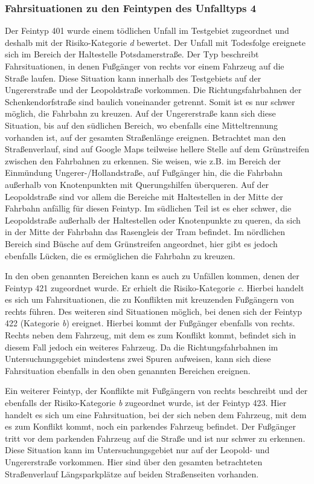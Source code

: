 \subsubsection{Fahrsituationen zu den Feintypen des Unfalltyps 4}
Der Feintyp 401 wurde einem tödlichen Unfall im Testgebiet zugeordnet und deshalb mit der Risiko-Kategorie \textit{d} bewertet. Der Unfall mit Todesfolge ereignete sich im Bereich der Haltestelle Potsdamerstraße. Der Typ beschreibt Fahrsituationen, in denen Fußgänger von rechts vor einem Fahrzeug auf die Straße laufen. Diese Situation kann innerhalb des Testgebiets auf der Ungererstraße und der Leopoldstraße vorkommen. Die Richtungsfahrbahnen der Schenkendorfstraße sind baulich voneinander getrennt. Somit ist es nur schwer möglich, die Fahrbahn zu kreuzen. Auf der Ungererstraße kann sich diese Situation, bis auf den südlichen Bereich, wo ebenfalls eine Mitteltrennung vorhanden ist, auf der gesamten Straßenlänge ereignen. Betrachtet man den Straßenverlauf, sind auf Google Maps teilweise hellere Stelle auf dem Grünstreifen zwischen den Fahrbahnen zu erkennen. Sie weisen, wie z.B. im Bereich der Einmündung Ungerer-/Hollandstraße, auf Fußgänger hin, die die Fahrbahn außerhalb von Knotenpunkten mit Querungshilfen überqueren. Auf der Leopoldstraße sind vor allem die Bereiche mit Haltestellen in der Mitte der Fahrbahn anfällig für diesen Feintyp. Im südlichen Teil ist es eher schwer, die Leopoldstraße außerhalb der Haltestellen oder Knotenpunkte zu queren, da sich in der Mitte der Fahrbahn das Rasengleis der Tram befindet. Im nördlichen Bereich sind Büsche auf dem Grünstreifen angeordnet, hier gibt es jedoch ebenfalls Lücken, die es ermöglichen die Fahrbahn zu kreuzen.

In den oben genannten Bereichen kann es auch zu Unfällen kommen, denen der Feintyp 421 zugeordnet wurde. Er erhielt die Risiko-Kategorie \textit{c}. Hierbei handelt es sich um Fahrsituationen, die zu Konflikten mit kreuzenden Fußgängern von rechts führen. Des weiteren sind Situationen möglich, bei denen sich der Feintyp 422 (Kategorie \textit{b}) ereignet. Hierbei kommt der Fußgänger ebenfalls von rechts. Rechts neben dem Fahrzeug, mit dem es zum Konflikt kommt, befindet sich in diesem Fall jedoch ein weiteres Fahrzeug. Da die Richtungsfahrbahnen im Untersuchungsgebiet mindestens zwei Spuren aufweisen, kann sich diese Fahrsituation ebenfalls in den oben genannten Bereichen ereignen.

Ein weiterer Feintyp, der Konflikte mit Fußgängern von rechts beschreibt und der ebenfalls der Risiko-Kategorie \textit{b} zugeordnet wurde, ist der Feintyp 423. Hier handelt es sich um eine Fahrsituation, bei der sich neben dem Fahrzeug, mit dem es zum Konflikt kommt, noch ein parkendes Fahrzeug befindet. Der Fußgänger tritt vor dem parkenden Fahrzeug auf die Straße und ist nur schwer zu erkennen. Diese Situation kann im Untersuchungsgebiet nur auf der Leopold- und Ungererstraße vorkommen. Hier sind über den gesamten betrachteten Straßenverlauf Längsparkplätze auf beiden Straßenseiten vorhanden.

